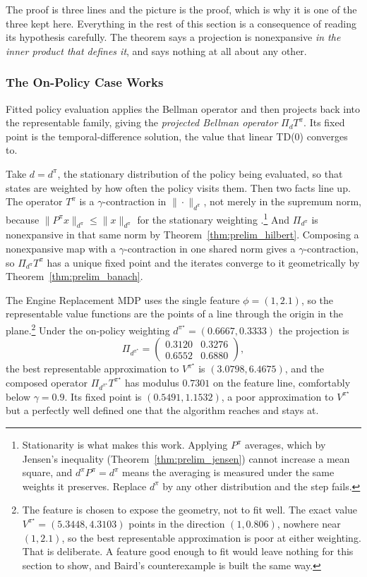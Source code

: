The proof is three lines and the picture is the proof, which is why it is one of the three kept here. Everything in the rest of this section is a consequence of reading its hypothesis carefully. The theorem says a projection is nonexpansive \emph{in the inner product that defines it}, and says nothing at all about any other.

\subsubsection{The On-Policy Case Works}

Fitted policy evaluation applies the Bellman operator and then projects back into the representable family, giving the \emph{projected Bellman operator} $\Pi_d T^\pi$. Its fixed point is the temporal-difference solution, the value that linear TD($0$) converges to.

Take $d = d^\pi$, the stationary distribution of the policy being evaluated, so that states are weighted by how often the policy visits them. Then two facts line up. The operator $T^\pi$ is a $\gamma$-contraction in $\|\cdot\|_{d^\pi}$, not merely in the supremum norm, because $\|P^\pi x\|_{d^\pi} \leq \|x\|_{d^\pi}$ for the stationary weighting \citep{tsitsiklis1997}.\footnote{Stationarity is what makes this work. Applying $P^\pi$ averages, which by Jensen's inequality (Theorem~\ref{thm:prelim_jensen}) cannot increase a mean square, and $d^\pi P^\pi = d^\pi$ means the averaging is measured under the same weights it preserves. Replace $d^\pi$ by any other distribution and the step fails.} And $\Pi_{d^\pi}$ is nonexpansive in that same norm by Theorem~\ref{thm:prelim_hilbert}. Composing a nonexpansive map with a $\gamma$-contraction in one shared norm gives a $\gamma$-contraction, so $\Pi_{d^\pi}T^\pi$ has a unique fixed point and the iterates converge to it geometrically by Theorem~\ref{thm:prelim_banach}.

The Engine Replacement MDP uses the single feature $\phi = (1, 2.1)$, so the representable value functions are the points of a line through the origin in the plane.\footnote{The feature is chosen to expose the geometry, not to fit well. The exact value $V^{\pi^\star} = (5.3448, 4.3103)$ points in the direction $(1, 0.806)$, nowhere near $(1, 2.1)$, so the best representable approximation is poor at either weighting. That is deliberate. A feature good enough to fit would leave nothing for this section to show, and Baird's counterexample \citep{Baird1995} is built the same way.} Under the on-policy weighting $d^{\pi^\star} = (0.6667, 0.3333)$ the projection is
\begin{equation*}
\Pi_{d^{\pi^\star}} = \begin{pmatrix} 0.3120 & 0.3276 \\ 0.6552 & 0.6880 \end{pmatrix},
\end{equation*}
the best representable approximation to $V^{\pi^\star}$ is $(3.0798, 6.4675)$, and the composed operator $\Pi_{d^{\pi^\star}} T^{\pi^\star}$ has modulus $0.7301$ on the feature line, comfortably below $\gamma = 0.9$. Its fixed point is $(0.5491, 1.1532)$, a poor approximation to $V^{\pi^\star}$ but a perfectly well defined one that the algorithm reaches and stays at.

